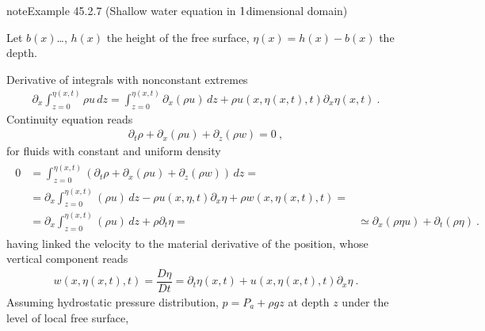 \documentclass[letterpaper,10pt,english]{jupyterBook}
\begin{document}
\begin{sphinxadmonition}{note}{Example 45.2.7 (Shallow water equation in \protect\(1\protect\)\sphinxhyphen{}dimensional domain)}



\sphinxAtStartPar
Let \(b(x)\)…, \(h(x)\) the height of the free surface, \(\eta(x) = h(x) - b(x)\) the depth.

\sphinxAtStartPar
Derivative of integrals with non\sphinxhyphen{}constant extremes
\begin{equation*}
\begin{split}\partial_x \int_{z=0}^{\eta(x,t)} \rho u \, dz = \int_{z=0}^{\eta(x,t)} \partial_x (\rho u) \, dz + \rho u(x,\eta(x,t),t) \partial_x \eta(x,t) \ .\end{split}
\end{equation*}
\sphinxAtStartPar
Continuity equation reads
\begin{equation*}
\begin{split}\partial_t \rho + \partial_x (\rho u ) + \partial_z (\rho w) = 0 \ ,\end{split}
\end{equation*}
\sphinxAtStartPar
for fluids with constant and uniform density
\begin{equation*}
\begin{split}\begin{aligned}
  0
  & = \int_{z=0}^{\eta(x,t)} \left( \partial_t \rho + \partial_x (\rho u) + \partial_z (\rho w) \right) \, dz = \\
  & = \partial_x \int_{z=0}^{\eta(x,t)} (\rho u) \, dz - \rho u(x,\eta,t) \partial_x \eta + \rho w(x,\eta(x,t),t) = \\
  & = \partial_x \int_{z=0}^{\eta(x,t)} (\rho u) \, dz + \rho \partial_t \eta = 
  & \simeq \partial_x \left(  \rho \eta u \right) + \partial_t \left( \rho \eta \right) \ .
\end{aligned}\end{split}
\end{equation*}
\sphinxAtStartPar
having linked the velocity to the material derivative of the position, whose vertical component reads
\begin{equation*}
\begin{split}w(x,\eta(x,t), t) = \dfrac{D \eta}{Dt} = \partial_t \eta(x,t) + u(x,\eta(x,t),t) \partial_x \eta \ .\end{split}
\end{equation*}
\sphinxAtStartPar
Assuming hydrostatic pressure distribution, \(p = P_a + \rho g z\) at depth \(z\) under the level of local free surface,


\end{sphinxadmonition}
\end{document}
